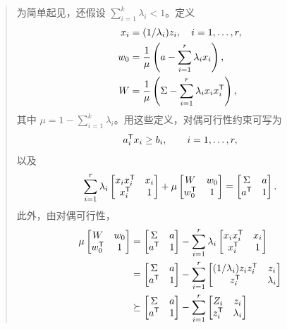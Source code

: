 \begin{quote}
为简单起见，还假设 $\sum_{i=1}^k\lambda_i<1$。定义
\[
\begin{aligned}
 x_i&=(1/\lambda_i)z_i,\quad i=1,\ldots,r,\\
 w_0&=\frac1\mu\left(a-\sum_{i=1}^r\lambda_ix_i\right),\\
 W&=\frac1\mu\left(\Sigma-\sum_{i=1}^r\lambda_ix_ix_i^{\mathsf T}\right),
\end{aligned}
\]
其中 $\mu=1-\sum_{i=1}^k\lambda_i$。用这些定义，对偶可行性约束可写为
\[
 a_i^{\mathsf T}x_i\ge b_i,\qquad i=1,\ldots,r,
\]
以及
\[
 \sum_{i=1}^r\lambda_i\begin{bmatrix}x_ix_i^{\mathsf T}&x_i\\x_i^{\mathsf T}&1\end{bmatrix}
 +\mu\begin{bmatrix}W&w_0\\w_0^{\mathsf T}&1\end{bmatrix}
 =\begin{bmatrix}\Sigma&a\\a^{\mathsf T}&1\end{bmatrix}.
\]
此外，由对偶可行性，
\[
\begin{aligned}
 \mu\begin{bmatrix}W&w_0\\w_0^{\T}&1\end{bmatrix}
 &=\begin{bmatrix}\Sigma&a\\a^{\T}&1\end{bmatrix}
   -\sum_{i=1}^r\lambda_i\begin{bmatrix}x_ix_i^{\T}&x_i\\x_i^{\T}&1\end{bmatrix}\\
 &=\begin{bmatrix}\Sigma&a\\a^{\T}&1\end{bmatrix}
   -\sum_{i=1}^r\begin{bmatrix}(1/\lambda_i)z_iz_i^{\T}&z_i\\z_i^{\T}&\lambda_i\end{bmatrix}\\
 &\succeq\begin{bmatrix}\Sigma&a\\a^{\T}&1\end{bmatrix}
   -\sum_{i=1}^r\begin{bmatrix}Z_i&z_i\\z_i^{\T}&\lambda_i\end{bmatrix}\\

\end{aligned}\]
\end{quote}
